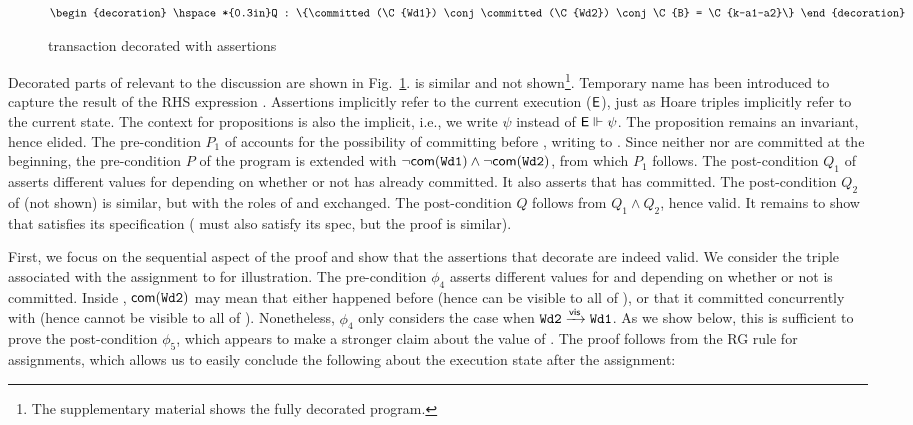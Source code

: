 \begin{figure}
\begin{txnimpcode}
$\begin{decoration}
  \hspace*{0.3in}Q : \{\committed(\C{Wd1}) \conj \committed(\C{Wd2}) \conj
                          \C{B} = \C{k-a1-a2}\}
\end{decoration}$
\end{txnimpcode}
\vspace*{-8pt}
\caption{\small {} transaction decorated with assertions}
\label{fig:wd1-decorated}
\vspace*{-12pt}
\end{figure}

Decorated parts of  relevant to the discussion are shown in
Fig.~\ref{fig:wd1-decorated}.   is similar and not
shown\footnote{The supplementary material shows the fully decorated program.}.
Temporary name  has been introduced to capture the result of the
RHS expression .  Assertions implicitly refer to the current
execution ($\textsf{E}$), just as Hoare triples implicitly refer to the
current state.  The context for propositions is also the implicit,
i.e., we write $\psi$ instead of $\textsf{E} \Vdash \psi$. The proposition  remains an invariant, hence elided. The pre-condition
$P_1$ of  accounts for the possibility of  committing
before , writing  to . Since neither  nor
 are committed at the beginning, the pre-condition $P$ of the
program is extended with $\neg\textsf{com}({\tt Wd1}) \wedge
\neg\textsf{com}({\tt Wd2})$, from which $P_1$ follows. The post-condition
$Q_1$ of  asserts different values for  depending on
whether or not  has already committed.  It also asserts that
 has committed. The post-condition $Q_2$ of  (not shown)
is similar, but with the roles of  and  exchanged. The
post-condition $Q$ follows from $Q_1 \wedge Q_2$, hence valid. It
remains to show that  satisfies its specification ( must
also satisfy its spec, but the proof is similar).

First, we focus on the sequential aspect of the proof and show that
the assertions that decorate  are indeed valid. We consider the
triple associated with the assignment to  for illustration. The
pre-condition $\phi_4$ asserts different values for  and 
depending on whether or not  is committed. Inside ,
$\textsf{com}({\tt Wd2})$ may mean that either  happened before
 (hence can be visible to all of ), or that it committed
concurrently with  (hence cannot be visible to all of ).
Nonetheless, $\phi_4$ only considers the case when ${\tt Wd2} \xrightarrow{\textsf{vis}}
{\tt Wd1}$. As we show below, this is sufficient to prove the
post-condition $\phi_5$, which appears to make a stronger claim about
the value of . The proof follows from the RG rule
 for assignments, which allows us to easily
conclude the following about the execution state after the
assignment:\vspace*{-12pt}

